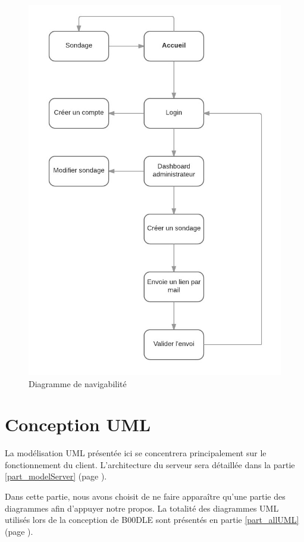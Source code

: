 \documentclass[titlepage]{report}
\begin{document}
\begin{figure}[h]
	\caption{Diagramme de navigabilité}
	\label{diagramme_navigabilite}
	\centering
	\includegraphics[scale=1]{figures/diagrammes/navigabilite.png}
\end{figure}

\clearpage

\chapter{Conception UML}

La modélisation UML présentée ici se concentrera principalement sur le fonctionnement du client. 
L'architecture du serveur sera détaillée dans la partie \ref{part_modelServer} (page \pageref{part_modelServer}). 
\par Dans cette partie, nous avons choisit de ne faire apparaître qu'une partie des diagrammes afin d'appuyer notre propos. 
La totalité des diagrammes UML utilisés lors de la conception de B00DLE sont présentés en partie \ref{part_allUML} (page \pageref{part_allUML}).
\end{document}
